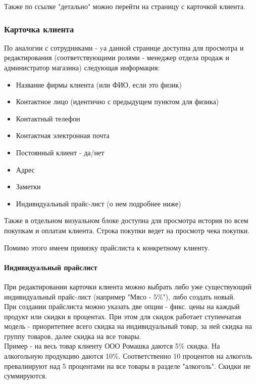 \documentclass[DIV=calc, paper=a4, fontsize=11pt]{scrartcl} %
\begin{document}
Также по ссылке "детально" можно перейти на страницу с карточкой клиента.

\subsubsection{Карточка клиента}

По аналогии с сотрудниками - yа данной странице доступна для просмотра и редактирования (соответствующими ролями - менеджер отдела продаж и администратор магазина) следующая информация: 

\begin{itemize}
	\item Название фирмы клиента (или ФИО, если это физик)
	\item Контактное лицо (идентично с предыдущем пунктом для физика)
	\item Контактный телефон
	\item Контактная электронная почта
	\item Постоянный клиент - да/нет
	\item Адрес 
	\item Заметки
	\item Индивидуальный прайс-лист (о нем подробнее ниже)
\end{itemize}

Также в отдельном визуальном блоке доступна для просмотра история по всем покупкам и оплатам клиента. Строка покупки ведет на просмотр чека покупки.  

Помимо этого имеем привязку прайслиста к конкретному клиенту.

\paragraph{Индивидуальный прайслист}

При редактировании карточки клиента можно выбрать либо уже существующий индивидуальный прайс-лист (например "Мясо - 5\%"), либо создать новый.
\\[0.5cm]
При создании прайслиста можно указать две опции - фикс. цены на каждый продукт или скидки в процентах. При этом для скидок работает ступенчатая модель - приоритетнее всего скидка на индивидуальный товар, за ней скидка на группу товаров, далее скидка на все товары.
\\[0.5cm]
Пример - на весь товар клиенту ООО Ромашка даются 5\% скидка. На алкогольную продукцию даются 10\%. Соответственно 10 процентов на алкоголь превалиируют над 5 процентами на все товары в разделе "алкоголь". Скидки не суммируются.
\end{document}
